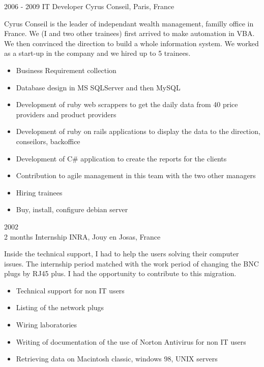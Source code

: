 \documentclass[]{bankcy}
\begin{document}
\newpage
\begin{entrylist}
    \entry
    {2006 - 2009}
    {IT Developer}
    {Cyrus Conseil, Paris, France}
    {Cyrus Conseil is the leader of independant wealth management, familly office in France. We (I and two other trainees) first arrived to make automation in VBA. We then convinced the direction to build a whole information system. We worked as a start-up in the company and we hired up to 5 trainees.\\
\begin{itemize}
\item Business Requirement collection
\item Database design in MS SQLServer and then MySQL
\item Development of ruby web scrappers to get the daily data from 40 price providers and product providers
\item Development of ruby on rails applications to display the data to the direction, conseilors, backoffice
\item Development of C\# application to create the reports for the clients
\item Contribution to agile management in this team with the two other managers
\item Hiring trainees
\item Buy, install, configure debian server
\end{itemize}    
    }
    \entry
    {2002\\ 2 months}
    {Internship}
    {INRA, Jouy en Josas, France}
    {Inside the technical support, I had to help the users solving their computer issues.
The internship period matched with the work period of changing the BNC plugs by RJ45 plus. I had the opportunity to contribute to this migration.
\begin{itemize}
\item Technical support for non IT users
\item Listing of the network plugs
\item Wiring laboratories
\item Writing of documentation of the use of Norton Antivirus for non IT users
\item Retrieving data on Macintosh classic, windows 98, UNIX servers
\end{itemize}
}
\end{entrylist}
\end{document}
